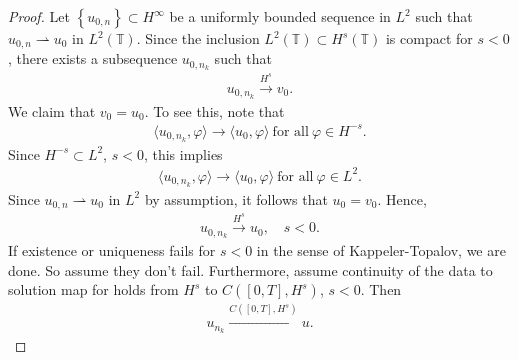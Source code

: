 \documentclass[12pt,reqno]{amsart}
\numberwithin{equation}{section}  %
\newcommand{\ci}{\mathbb{T}}
\newcommand{\vp}{\varphi}
\begin{document}
    \begin{proof}
      Let 
      $\left\{ u_{0,n} \right\} \subset H^{\infty}$ be a uniformly bounded
      sequence in $L^{2}$ such that $u_{0,n}
      \rightharpoonup u_{0}$ in $L^{2}(\ci)$. 
      Since the
      inclusion $L^{2}(\ci) \subset H^{s}(\ci)$ is compact for $s<0$, there
      exists a subsequence $u_{0,n_{k}}$ such that
      \begin{equation*}
      \begin{split}
        u_{0,n_{k}} \xrightarrow{H^{s}} v_{0}.
      \end{split}
      \end{equation*}
      We claim that $v_{0} = u_{0}$. To see this, note that
      \begin{equation*}
      \begin{split}
        \langle u_{0, n_{k}}, \vp \rangle  \to \langle u_{0}, \vp \rangle \
        \text{for all} \ \vp \in H^{-s}.
      \end{split}
      \end{equation*}
      Since $H^{-s} \subset L^{2}$, $s < 0$, this implies
      \begin{equation*}
      \begin{split}
      \langle u_{0, n_{k}}, \vp \rangle  \to \langle u_{0}, \vp \rangle \
      \text{for all} \ \vp \in L^{2}.
      \end{split}
      \end{equation*}
      Since $u_{0,n} \rightharpoonup u_{0}$ in $L^{2}$ by assumption, it follows that
      $u_{0} = v_{0}$. Hence,
      \begin{equation*}
      \begin{split}
        u_{0,n_{k}} \xrightarrow{H^{s}}u_{0}, \quad s<0.
      \end{split}
      \end{equation*}
      If existence or uniqueness fails for $s<0$ in the sense of
      Kappeler-Topalov, we are done. So assume
      they don't fail. Furthermore, assume continuity of the data to solution map for
      holds from $H^{s}$ to $C([0, T], H^{s})$, $s < 0$. Then
      \begin{equation}
        \label{s-conv}
      \begin{split}
      u_{n_{k}} \xrightarrow{C\left( [0,T], H^{s} \right)} u.
      \end{split}

\end{equation}
\end{proof}
\end{document}
